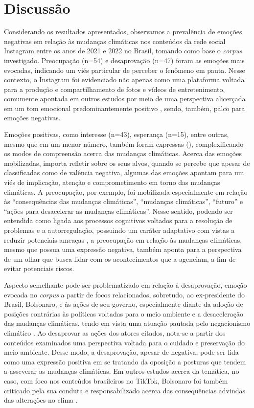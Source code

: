 \documentclass[portuguese]{textolivre}
\begin{document}
\section{Discussão}\label{sec-organizacao-latex}
Considerando os resultados apresentados, observamos a prevalência de emoções negativas em relação às mudanças climáticas nos conteúdos da rede social Instagram entre os anos de 2021 e 2022 no Brasil, tomando como base o \textit{corpus} investigado. Preocupação (n=54) e desaprovação (n=47) foram as emoções mais evocadas, indicando um viés particular de perceber o fenômeno em pauta. Nesse contexto, o Instagram foi evidenciado não apenas como uma plataforma voltada para a produção e compartilhamento de fotos e vídeos de entretenimento, comumente apontada em outros estudos por meio de uma perspectiva alicerçada em um tom emocional predominantemente positivo \cite{sonne2018expression}, sendo, também, palco para emoções negativas.

Emoções positivas, como interesse (n=43), esperança (n=15), entre outras, mesmo que em um menor número, também foram expressas (), complexificando os modos de compreensão acerca das mudanças climáticas. Acerca das emoções mobilizadas, importa refletir sobre os seus alvos, quando se percebe que apesar de classificadas como de valência negativa, algumas das emoções apontam para um viés de implicação, atenção e comprometimento em torno das mudanças climáticas. A preocupação, por exemplo, foi mobilizada especialmente em relação às “consequências das mudanças climáticas”, “mudanças climáticas”, “futuro” e “ações para desacelerar as mudanças climáticas”. Nesse sentido, podendo ser entendida como ligada aos processos cognitivos voltados para a resolução de problemas e a autorregulação, possuindo um caráter adaptativo com vistas a reduzir potenciais ameaças \cite{watkins2008repetitive}, a preocupação em relação às mudanças climáticas, mesmo que possua uma expressão negativa, também aponta para a perspectiva de um olhar que busca lidar com os acontecimentos que a agenciam, a fim de evitar potenciais riscos.

Aspecto semelhante pode ser problematizado em relação à desaprovação, emoção evocada no \textit{corpus} a partir de focos relacionados, sobretudo, ao ex-presidente do Brasil, Bolsonaro, e às ações de seu governo, especialmente diante da adoção de posições contrárias às políticas voltadas para o meio ambiente e a desaceleração das mudanças climáticas, tendo em vista uma atuação pautada pelo negacionismo climático \cite{fearnside2019retrocessos,miguel2022negacionismo}. Ao desaprovar as ações dos atores citados, nota-se a partir dos conteúdos examinados uma perspectiva voltada para o cuidado e preservação do meio ambiente. Desse modo, a desaprovação, apesar de negativa, pode ser lida como uma expressão positiva em se tratando da oposição a posturas que tendem a asseverar as mudanças climáticas. Em outros estudos acerca da temática, no caso, com foco nos conteúdos brasileiros no TikTok, Bolsonaro foi também criticado pela sua conduta e responsabilizado acerca das consequências advindas das alterações no clima \cite{evangelista2024narrativas}.
\end{document}
